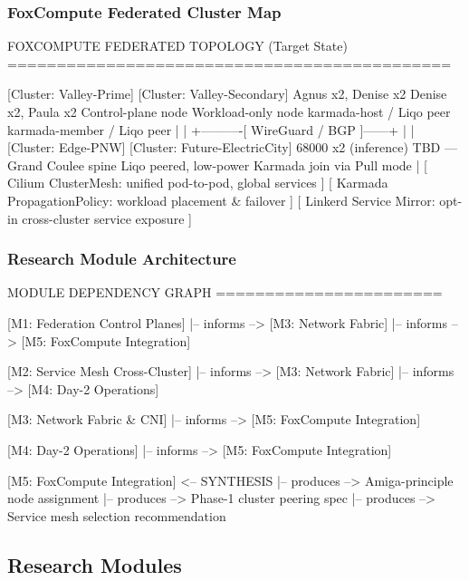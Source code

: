 \documentclass[11pt,letterpaper]{article}
\begin{document}
\subsubsection{FoxCompute Federated Cluster Map}

\begin{asciibox}
  FOXCOMPUTE FEDERATED TOPOLOGY (Target State)
  =============================================

  [Cluster: Valley-Prime]          [Cluster: Valley-Secondary]
  Agnus x2, Denise x2             Denise x2, Paula x2
  Control-plane node              Workload-only node
  karmada-host / Liqo peer        karmada-member / Liqo peer
        |                                  |
        +----------[ WireGuard / BGP ]------+
        |                                  |
  [Cluster: Edge-PNW]             [Cluster: Future-ElectricCity]
  68000 x2 (inference)            TBD --- Grand Coulee spine
  Liqo peered, low-power          Karmada join via Pull mode
        |
  [ Cilium ClusterMesh: unified pod-to-pod, global services ]
  [ Karmada PropagationPolicy: workload placement & failover ]
  [ Linkerd Service Mirror: opt-in cross-cluster service exposure ]
\end{asciibox}

\subsubsection{Research Module Architecture}

\begin{asciibox}
  MODULE DEPENDENCY GRAPH
  =======================

  [M1: Federation Control Planes]
       |-- informs --> [M3: Network Fabric]
       |-- informs --> [M5: FoxCompute Integration]

  [M2: Service Mesh Cross-Cluster]
       |-- informs --> [M3: Network Fabric]
       |-- informs --> [M4: Day-2 Operations]

  [M3: Network Fabric & CNI]
       |-- informs --> [M5: FoxCompute Integration]

  [M4: Day-2 Operations]
       |-- informs --> [M5: FoxCompute Integration]

  [M5: FoxCompute Integration]  <-- SYNTHESIS
       |-- produces --> Amiga-principle node assignment
       |-- produces --> Phase-1 cluster peering spec
       |-- produces --> Service mesh selection recommendation
\end{asciibox}

\subsection{Research Modules}
\end{document}

